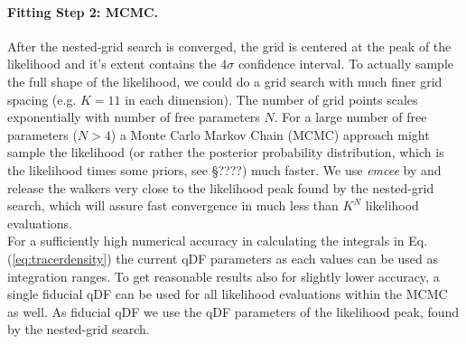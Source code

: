 \paragraph{Fitting Step 2: MCMC.} After the nested-grid search is converged, the grid is centered at the peak of the likelihood and it's extent contains the $4\sigma$ confidence interval. To actually sample the full shape of the likelihood, we could do a grid search with much finer grid spacing (e.g. $K=11$ in each dimension). The number of grid points scales exponentially with number of free parameters $N$. For a large number of free parameters ($N>4$) a Monte Carlo Markov Chain (MCMC) approach might sample the likelihood (or rather the posterior probability distribution, which is the likelihood times some priors, see \S ????) much faster. We use \emph{emcee} by \citet{formanmackey??} and release the walkers very close to the likelihood peak found by the nested-grid search, which will assure fast convergence in much less than $K^N$ likelihood evaluations.
\\For a sufficiently high numerical accuracy in calculating the integrals in Eq. (\ref{eq:tracerdensity}) the current qDF parameters as each values can be used as integration ranges. To get reasonable results also for slightly lower accuracy, a single fiducial qDF can be used for all likelihood evaluations within the MCMC as well. As fiducial qDF we use the qDF parameters of the likelihood peak, found by the nested-grid search.
